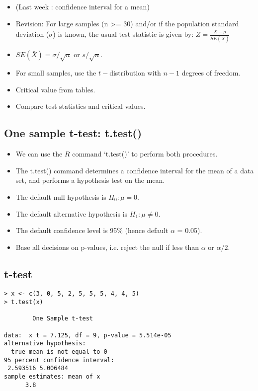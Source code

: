 \documentclass[a4paper,12pt]{article}
\begin{document}
\begin{itemize}
\item (Last week : confidence interval for a mean) \item Revision:
For large samples (n >= 30) and/or if the population standard
deviation ($\sigma$) is known, the usual test statistic is given
by: $Z =\frac{\bar{X} - \mu}{SE(\bar{X})}$

\item $SE(\bar{X}) = \sigma /\sqrt{n}$ or $s / \sqrt{n}$. \item For small samples, use the $t-$distribution
with $n-1$ degrees of freedom.
\item
Critical value from tables.
\item Compare test statistics and critical values.
\end{itemize}



\subsection{One sample t-test: t.test()}
\begin{itemize}
\item We can use the $R$ command `t.test()' to perform both procedures.
\item The t.test() command determines a confidence interval for the
mean of a data set, and performs a hypothesis test on the mean.
\item
The default null hypothesis is $H_{0}: \mu = 0$.
\item The default alternative hypothesis is $H_{1}: \mu \neq 0$.\\
\item The default confidence level is 95\% (hence default $\alpha$ = 0.05).
\item Base all decisions on p-values, i.e. reject the null if less than $\alpha$ or $\alpha/2$.
\end{itemize}

\subsection{t-test}
\begin{verbatim}
> x <- c(3, 0, 5, 2, 5, 5, 5, 4, 4, 5)
> t.test(x)

        One Sample t-test

data:  x t = 7.125, df = 9, p-value = 5.514e-05
alternative hypothesis:
  true mean is not equal to 0
95 percent confidence interval:
 2.593516 5.006484
sample estimates: mean of x
      3.8

\end{verbatim}
\end{document}
